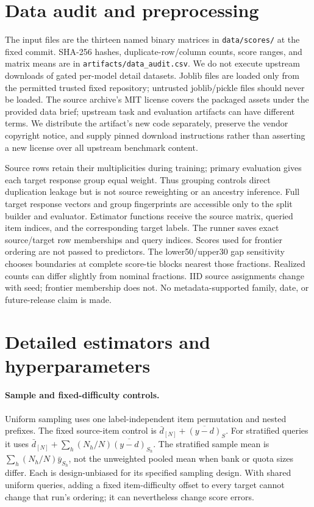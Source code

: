 \section{Data audit and preprocessing}\label{app:data}
\begin{table}[h]
\caption{Actual data dimensions and seed-0 frontier group counts. ``Unique'' means exact response groups, not independent model families. Constant items and zero-score rows remain.}\label{tab:data}
\centering\scriptsize\setlength{\tabcolsep}{4pt}
\end{table}
The input files are the thirteen named binary matrices in \texttt{data/scores/} at the fixed commit. SHA-256 hashes, duplicate-row/column counts, score ranges, and matrix means are in \texttt{artifacts/data\_audit.csv}. We do not execute upstream downloads of gated per-model detail datasets. Joblib files are loaded only from the permitted trusted fixed repository; untrusted joblib/pickle files should never be loaded. The source archive's MIT license covers the packaged assets under the provided data brief; upstream task and evaluation artifacts can have different terms. We distribute the artifact's new code separately, preserve the vendor copyright notice, and supply pinned download instructions rather than asserting a new license over all upstream benchmark content.

Source rows retain their multiplicities during training; primary evaluation gives each target response group equal weight. Thus grouping controls direct duplication leakage but is not source reweighting or an ancestry inference. Full target response vectors and group fingerprints are accessible only to the split builder and evaluator. Estimator functions receive the source matrix, queried item indices, and the corresponding target labels. The runner saves exact source/target row memberships and query indices. Scores used for frontier ordering are not passed to predictors. The lower50/upper30 gap sensitivity chooses boundaries at complete score-tie blocks nearest those fractions. Realized counts can differ slightly from nominal fractions. IID source assignments change with seed; frontier membership does not. No metadata-supported family, date, or future-release claim is made.

\section{Detailed estimators and hyperparameters}\label{app:settings}
\paragraph{Sample and fixed-difficulty controls.}
Uniform sampling uses one label-independent item permutation and nested prefixes. The fixed source-item control is $\bar d_{[N]}+\overline{(y-d)}_S$. For stratified queries it uses $\bar d_{[N]}+\sum_h(N_h/N)\overline{(y-d)}_{S_h}$. The stratified sample mean is $\sum_h(N_h/N)\bar y_{S_h}$, not the unweighted pooled mean when bank or quota sizes differ. Each is design-unbiased for its specified sampling design. With shared uniform queries, adding a fixed item-difficulty offset to every target cannot change that run's ordering; it can nevertheless change score errors.

